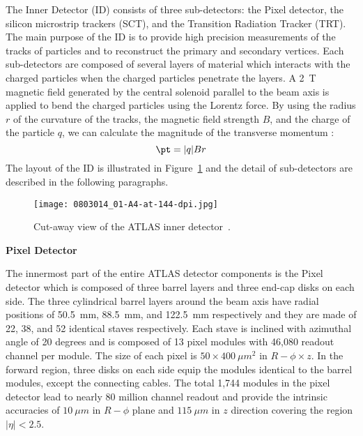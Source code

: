 The Inner Detector (ID) consists of three sub-detectors: the Pixel detector, the silicon microstrip trackers  (SCT), and the Transition Radiation Tracker (TRT).
The main purpose of the ID is to provide high precision measurements of the tracks of particles and to reconstruct the primary and secondary vertices.
Each sub-detectors are composed of several layers of material which interacts with the charged particles when the charged particles penetrate the layers.
A  2~T magnetic field generated by the central solenoid parallel to the beam axis is applied to bend the charged particles using the Lorentz force.
By using the radius $r$ of the curvature of the tracks, the magnetic field strength $B$, and the charge of the particle $q$, we can calculate the magnitude of the transverse momentum \pt:
\begin{equation}
\pt = |q|Br
\end{equation}
The layout of the ID is illustrated in Figure~\ref{fig:Inner_detector} and the detail of sub-detectors are described in the following paragraphs.

\begin{figure}[htbp]
\begin{center}
\texttt{[image: 0803014\_01-A4-at-144-dpi.jpg]}
\caption{Cut-away view of the ATLAS inner detector~\cite{1748-0221-3-08-S08003}.}
\label{fig:Inner_detector}
\end{center}
\end{figure}

\noindent \textbf{Pixel Detector}

The innermost part of the entire ATLAS detector components is the Pixel detector which is composed of three barrel layers and three end-cap disks on each side.
The three cylindrical barrel layers around the beam axis have radial positions of 50.5~mm, 88.5~mm, and 122.5~mm respectively and they are made of 22, 38, and 52 identical staves respectively.
Each stave is inclined with azimuthal angle of 20 degrees and is composed of 13 pixel modules with 46,080 readout channel per module.
The size of each pixel is $50 \times 400~\mu m^{2}$ in $R-\phi \times z$.
In the forward region, three disks on each side equip the modules identical to the barrel modules, except the connecting cables. 
The total 1,744 modules in the pixel detector lead to nearly 80 million channel readout and provide the intrinsic accuracies of $10~\mu m$ in $R-\phi$ plane and $115~\mu m$ in $z$ direction covering the region $|\eta| < 2.5$. 

